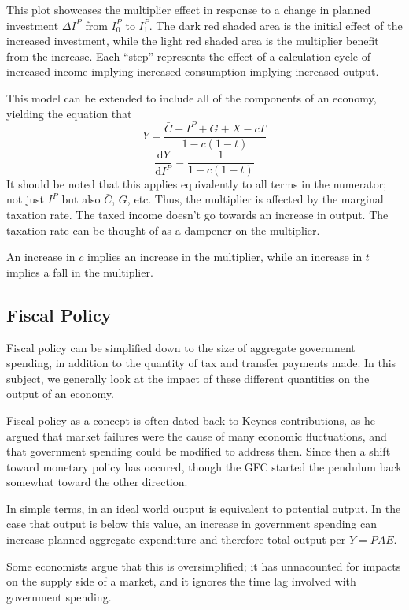 \documentclass[12pt]{report}
\newcommand{\dd}[2]{\frac{\mathrm{d}#1}{\mathrm{d}#2}}
\begin{document}
\begin{flushleft}
This plot showcases the multiplier effect in response to a change in planned
investment \(\Delta I^P\) from \(I^P_0\) to \(I^P_1\). The dark red shaded 
area is the initial effect of the increased investment, while the light red 
shaded area is the multiplier benefit from the increase. Each ``step'' 
represents the effect of a calculation cycle of increased income implying 
increased consumption implying increased output. \par
This model can be extended to include all of the components of an economy, 
yielding the equation that
\[Y  = \frac{\bar{C} + I^P + G + X - cT}{1  - c(1 - t)}\]
\[\dd{Y}{I^P} = \frac{1}{1 - c(1 - t)}\]
It should be noted that this applies equivalently to all terms in the 
numerator; not just \(I^P\) but also \(\bar{C}\), \(G\), etc. Thus, the 
multiplier is affected by the marginal taxation rate. The taxed income doesn't
go towards an increase in output. The taxation rate can be thought of as a 
dampener on the multiplier. \par
An increase in \(c\) implies an increase in the multiplier, while an increase
in \(t\) implies a fall in the multiplier.

\subsection*{Fiscal Policy}

Fiscal policy can be simplified down to the size of aggregate government
spending, in addition to the quantity of tax and transfer payments made. In
this subject, we generally look at the impact of these different quantities on
the output of an economy. \par
Fiscal policy as a concept is often dated back to Keynes contributions, as
he argued that market failures were the cause of many economic fluctuations,
and that government spending could be modified to address then. Since then a
shift toward monetary policy has occured, though the GFC started the pendulum
back somewhat toward the other direction. \par
In simple terms, in an ideal world output is equivalent to potential output. In
the case that output is below this value, an increase in government spending
can increase planned aggregate expenditure and therefore total output per 
\(Y = PAE\). \par
Some economists argue that this is oversimplified; it has unnacounted for
impacts on the supply side of a market, and it ignores the time lag involved
with government spending.


\end{flushleft}
\end{document}

